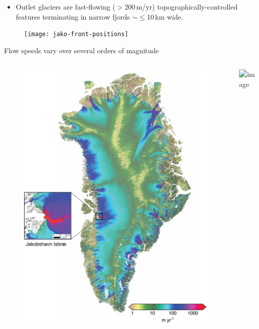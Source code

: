 \documentclass[hide notes,intlimits]{beamer}
\begin{document}
\begin{frame}[plain]
    \begin{itemize}
    \item Outlet glaciers are fast-flowing ($>$200\,m/yr) topographically-controlled features terminating in narrow fjords $\sim\le$10\,km wide.
    \end{itemize}
    \begin{figure}
      \texttt{[image: jako-front-positions]}
  \end{figure}
\end{frame}

{
%
} 

\begin{frame}{Flow speeds vary over several orders of magnitude}
\vspace{-0.74em}
  \begin{columns}
    \column[c]{5cm}
    \begin{figure}
      \includegraphics[width=\textwidth]{greenland-obs-overview}
    \end{figure}
    \column[c]{5cm}
    \includegraphics<1>[width=\textwidth]{jakobshavn-obs-nogate}
  \end{columns}
\end{frame}
\end{document}
